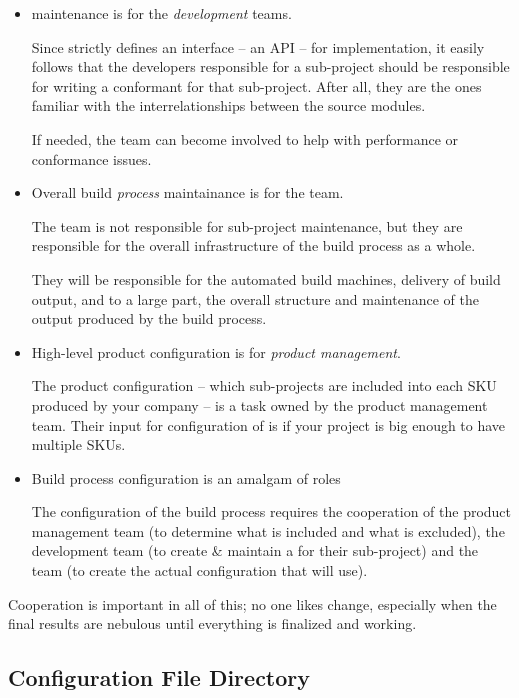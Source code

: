 \begin{itemize}
  \item \makefile maintenance is for the \emph{development} teams.

    Since \lmsbw strictly defines an interface -- an API -- for
    \makefile implementation, it easily follows that the developers
    responsible for a sub-project should be responsible for writing a
    conformant \makefile for that sub-project.  After all, they are
    the ones familiar with the interrelationships between the source
    modules.

    If needed, the \bni team can become involved to help with
    performance or conformance issues.

  \item Overall build \emph{process} maintainance is for the
    \emph{\bni} team.

    The \bni team is not responsible for sub-project \makefile
    maintenance, but they are responsible for the overall
    infrastructure of the build process as a whole.

    They will be responsible for the automated build machines,
    delivery of build output, and to a large part, the overall
    structure and maintenance of the output produced by the build
    process.

  \item High-level product configuration is for \emph{product
    management}.

    The product configuration -- which sub-projects are included into
    each SKU produced by your company -- is a task owned by the
    product management team.  Their input for configuration of \lmsbw
    is if your project is big enough to have multiple SKUs.

  \item Build process configuration is an amalgam of roles

    The configuration of the build process requires the cooperation of
    the product management team (to determine what is included and
    what is excluded), the development team (to create \& maintain a
    \makefile for their sub-project) and the \bni team (to create the
    actual configuration that \lmsbw will use).
\end{itemize}

Cooperation is important in all of this; no one likes change,
especially when the final results are nebulous until everything is
finalized and working.

\subsection{Configuration File Directory}

